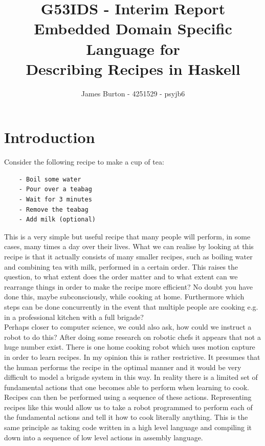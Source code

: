 \documentclass[11pt]{article}
\title
{ 
    \vspace{10em}
    G53IDS - Interim Report \\
    \hfill \break
    \large Embedded Domain Specific Language for \\
    Describing Recipes in Haskell
}
\author{James Burton - 4251529 - psyjb6}
\begin{document}
    \maketitle
    \newpage

    \tableofcontents
    \newpage

    \section{Introduction}
    Consider the following recipe to make a cup of tea:

    \begin{tt}
    \small
    \begin{lstlisting}
    - Boil some water
    - Pour over a teabag
    - Wait for 3 minutes
    - Remove the teabag
    - Add milk (optional)
    \end{lstlisting}
    \end{tt}

    This is a very simple but useful recipe that many people
    will perform, in some cases, many times a day over their lives.
    What we can realise by looking at this recipe is that it actually
    consists of many smaller recipes, such as boiling water and
    combining tea with milk, performed in a certain order. This
    raises the question, to what extent does the order matter and
    to what extent can we rearrange things in order to make the recipe
    more efficient? No doubt you have done this, maybe subconsciously,
    while cooking at home. Furthermore which steps can be done
    concurrently in the event that multiple people are cooking e.g.
    in a professional kitchen with a full brigade? \\

    Perhaps closer to computer science, we could also ask, how could
    we instruct a robot to do this? After doing some research on
    robotic chefs it appears that not a huge number exist.
    There is one home cooking robot \cite{robot} which uses motion
    capture in order to learn recipes. In my opinion this is rather
    restrictive. It presumes that the human performs the recipe in
    the optimal manner and it would be very difficult to model
    a brigade system in this way. In reality there is a limited set
    of fundamental actions that one becomes able to perform when
    learning to cook. Recipes can then be performed using a sequence
    of these actions. Representing recipes like this would allow us
    to take a robot programmed to perform each of the fundamental
    actions and tell it how to cook literally anything. This is the
    same principle as taking code written in a high level language
    and compiling it down into a sequence of low level actions in
    assembly language. \\
\end{document}
